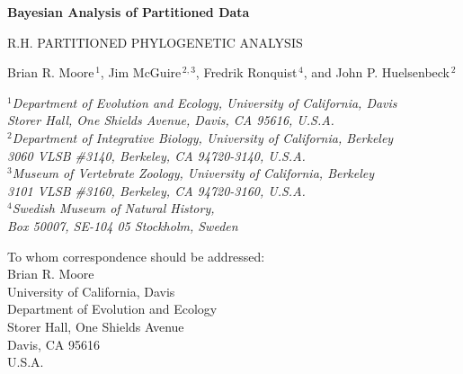 \documentclass[11pt]{article}
\begin{document}


\begin{titlepage}
\begin{center}

{\Large\bf Bayesian Analysis of Partitioned Data}

\vfill

R.H. PARTITIONED PHYLOGENETIC ANALYSIS

\vfill

{\sc Brian R. Moore$^{\,1}$, Jim McGuire$^{\,2,3}$, Fredrik Ronquist$^{\,4}$, and John P. Huelsenbeck$^{\,2}$} \\

\bigskip

{\em
$\mbox{}^1$Department of Evolution and Ecology, University of California, Davis\\
\vspace{-0.4\baselineskip}
Storer Hall, One Shields Avenue, Davis, CA 95616, \mbox{U.S.A.} \\

$\mbox{}^2$Department of Integrative Biology, University of California, Berkeley\\
\vspace{-0.4\baselineskip}
3060 VLSB \#3140, Berkeley, CA 94720-3140, \mbox{U.S.A.} \\

$\mbox{}^3$Museum of Vertebrate Zoology, University of California, Berkeley\\
\vspace{-0.4\baselineskip}
3101 VLSB \#3160, Berkeley, CA 94720-3160, \mbox{U.S.A.} \\

$\mbox{}^4$Swedish Museum of Natural History,\\
\vspace{-0.4\baselineskip}
Box 50007, SE-104 05 Stockholm, Sweden \\
}
\end{center}




\vfill

\begin{flushleft}
To whom correspondence should be addressed: \\
Brian R. Moore \\
\vspace{-0.4\baselineskip}
University of California, Davis \\ 
\vspace{-0.4\baselineskip}
Department of Evolution and Ecology \\
\vspace{-0.4\baselineskip}
Storer Hall, One Shields Avenue \\
\vspace{-0.4\baselineskip}
Davis, CA 95616 \\
\vspace{-0.4\baselineskip}
\mbox{U.S.A.}


\end{flushleft}
\end{titlepage}
\end{document}
